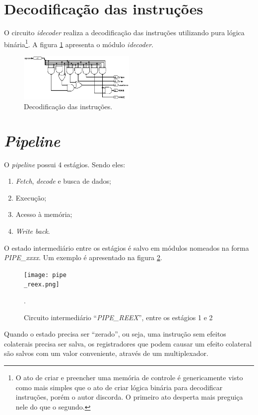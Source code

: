 \documentclass{article}
\begin{document}
\section{Decodificação das instruções}

O circuito \textit{idecoder} realiza a decodificação das instruções utilizando
pura lógica binária\footnote{O ato de criar e preencher uma memória de controle
é genericamente visto como mais simples que o ato de criar lógica binária para
decodificar instruções, porém o autor discorda. O primeiro ato desperta mais
preguiça nele do que o segundo.}. A figura \ref{decode} apresenta o módulo
\textit{idecoder}.

\begin{figure}[ht]
	\centering
	\includegraphics[width=0.5\textwidth]{idecoder.png}
	\caption{Decodificação das instruções.}
	\label{decode}
\end{figure}

\section{\textit{Pipeline}}

O \textit{pipeline} possui 4 estágios. Sendo eles:

\begin{enumerate}
	\item \textit{Fetch}, \textit{decode} e busca de dados;
	\item Execução;
	\item Acesso à memória;
	\item \textit{Write back}.
\end{enumerate}

O estado intermediário entre os estágios é salvo em módulos nomeados na forma
\textit{PIPE\_xxxx}. Um exemplo é apresentado na figura \ref{pipe}.

\begin{figure}[ht]
	\centering
	\texttt{[image: pipe\\\_reex.png]}
	\caption{Circuito intermediário ``\textit{PIPE\_REEX}'', entre os estágios 1 e
	2}.
	\label{pipe}
\end{figure}

Quando o estado precisa ser ``zerado'', ou seja, uma instrução sem efeitos
colaterais precisa ser salva, os registradores que podem causar um efeito
colateral são salvos com um valor conveniente, através de um multiplexador.
\end{document}
